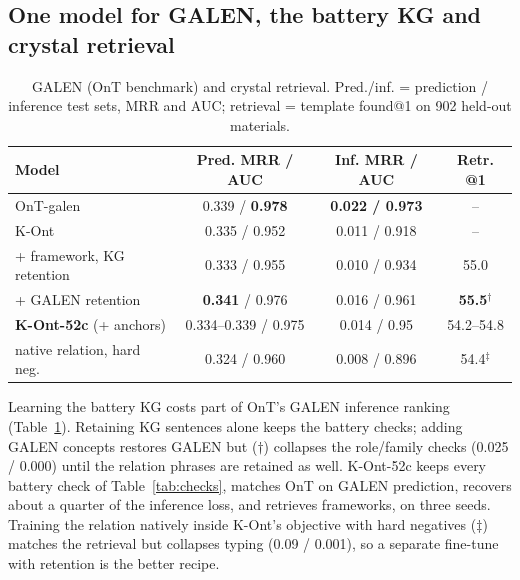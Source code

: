 \documentclass[conference]{IEEEtran}
\begin{document}
\subsection{One model for GALEN, the battery KG and crystal retrieval}
\begin{table}[t]
\centering
\caption{GALEN (OnT benchmark) and crystal retrieval. Pred./inf. = prediction / inference test sets, MRR and AUC; retrieval = template found@1 on 902 held-out materials.}
\label{tab:galen}
\footnotesize
\setlength{\tabcolsep}{3pt}
\begin{tabular}{lccc}
\toprule
Model & Pred. MRR / AUC & Inf. MRR / AUC & Retr. @1 \\
\midrule
OnT-galen~\cite{yang2025ont} & 0.339 / \textbf{0.978} & \textbf{0.022 / 0.973} & -- \\
K-Ont & 0.335 / 0.952 & 0.011 / 0.918 & -- \\
+ framework, KG retention & 0.333 / 0.955 & 0.010 / 0.934 & 55.0 \\
+ GALEN retention & \textbf{0.341} / 0.976 & 0.016 / 0.961 & \textbf{55.5}$^\dagger$ \\
\textbf{K-Ont-52c} (+ anchors) & 0.334--0.339 / 0.975 & 0.014 / 0.95 & 54.2--54.8 \\
native relation, hard neg. & 0.324 / 0.960 & 0.008 / 0.896 & 54.4$^\ddagger$ \\
\bottomrule
\end{tabular}
\end{table}
Learning the battery KG costs part of OnT's GALEN inference ranking (Table~\ref{tab:galen}). Retaining KG sentences alone keeps the battery checks; adding GALEN concepts restores GALEN but ($\dagger$) collapses the role/family checks (0.025 / 0.000) until the relation phrases are retained as well. K-Ont-52c keeps every battery check of Table~\ref{tab:checks}, matches OnT on GALEN prediction, recovers about a quarter of the inference loss, and retrieves frameworks, on three seeds. Training the relation natively inside K-Ont's objective with hard negatives ($\ddagger$) matches the retrieval but collapses typing (0.09 / 0.001), so a separate fine-tune with retention is the better recipe.
\end{document}
